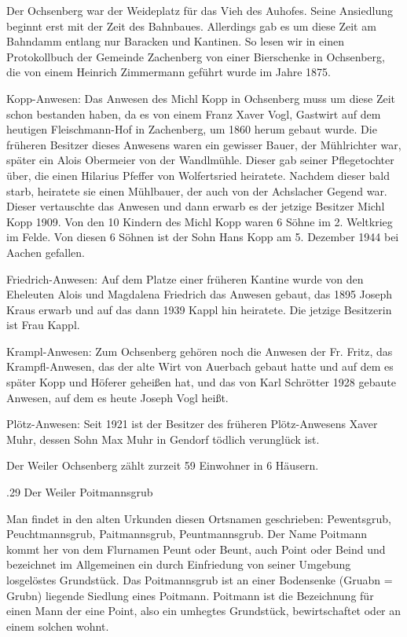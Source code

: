 Der Ochsenberg war der Weideplatz für das Vieh des Auhofes. Seine Ansiedlung
beginnt erst mit der Zeit des Bahnbaues. Allerdings gab es um diese Zeit am
Bahndamm entlang nur Baracken und Kantinen. So lesen wir in einen Protokollbuch
der Gemeinde Zachenberg von einer Bierschenke in Ochsenberg, die von einem
Heinrich Zimmermann geführt wurde im Jahre 1875.

Kopp-Anwesen: Das Anwesen des Michl Kopp in Ochsenberg muss um diese Zeit schon
bestanden haben, da es von einem Franz Xaver Vogl, Gastwirt auf dem heutigen
Fleischmann-Hof in Zachenberg, um 1860 herum gebaut wurde. Die früheren Besitzer
dieses Anwesens waren ein gewisser Bauer, der Mühlrichter war, später ein Alois
Obermeier von der Wandlmühle. Dieser gab seiner Pflegetochter über, die einen
Hilarius Pfeffer von Wolfertsried heiratete. Nachdem dieser bald starb,
heiratete sie einen Mühlbauer, der auch von der Achslacher Gegend war. Dieser
vertauschte das Anwesen und dann erwarb es der jetzige Besitzer Michl Kopp 1909.
Von den 10 Kindern des Michl Kopp waren 6 Söhne im 2. Weltkrieg im Felde. Von
diesen 6 Söhnen ist der Sohn Hans Kopp am 5. Dezember 1944 bei Aachen gefallen.

Friedrich-Anwesen: Auf dem Platze einer früheren Kantine wurde von den Eheleuten
Alois und Magdalena Friedrich das Anwesen gebaut, das 1895 Joseph Kraus erwarb
und auf das dann 1939 Kappl hin heiratete. Die jetzige Besitzerin ist Frau
Kappl.

Krampl-Anwesen: Zum Ochsenberg gehören noch die Anwesen der Fr. Fritz, das
Krampfl-Anwesen, das der alte Wirt von Auerbach gebaut hatte und auf dem es
später Kopp und Höferer geheißen hat, und das von Karl Schrötter 1928 gebaute
Anwesen, auf dem es heute Joseph Vogl heißt.

Plötz-Anwesen: Seit 1921 ist der Besitzer des früheren Plötz-Anwesens Xaver
Muhr, dessen Sohn Max Muhr in Gendorf tödlich verunglück ist.

Der Weiler Ochsenberg zählt zurzeit 59 Einwohner in 6 Häusern.

.29 Der Weiler Poitmannsgrub

Man findet in den alten Urkunden diesen Ortsnamen geschrieben: Pewentsgrub,
Peuchtmannsgrub, Paitmannsgrub, Peuntmannsgrub. Der Name Poitmann kommt her von
dem Flurnamen Peunt oder Beunt, auch Point oder Beind und bezeichnet im
Allgemeinen ein durch Einfriedung von seiner Umgebung losgelöstes Grundstück.
Das Poitmannsgrub ist an einer Bodensenke (Gruabn = Grubn) liegende Siedlung
eines Poitmann. Poitmann ist die Bezeichnung für einen Mann der eine Point, also
ein umhegtes Grundstück, bewirtschaftet oder an einem solchen wohnt.


